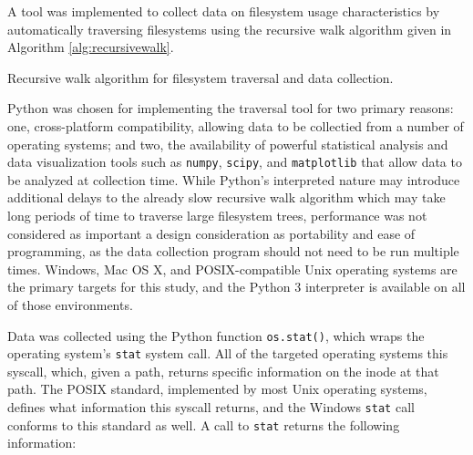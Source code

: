 \documentclass[12pt,a4paper]{article}
\begin{document}
			A tool was implemented to collect data on filesystem usage characteristics by automatically traversing filesystems using the recursive walk algorithm given in Algorithm \ref{alg:recursivewalk}.
		
			\begin{algorithm}
				\caption{Recursive walk algorithm for filesystem traversal and data collection.}
				\label{alg:recursivewalk}
				\begin{algorithmic}[1]
			   		\State {}
			     	\State {}
			     	\EndIf
			   	\EndFor
				\EndProcedure
				\end{algorithmic}
			\end{algorithm}

			Python was chosen for implementing the traversal tool for two primary reasons: one, cross-platform compatibility, allowing data to be collectied from a number of operating systems; and two, the availability of powerful statistical analysis and data visualization tools such as \texttt{numpy}, \texttt{scipy}, and \texttt{matplotlib} that allow data to be analyzed at collection time. While Python's interpreted nature may introduce additional delays to the already slow recursive walk algorithm which may take long periods of time to traverse large filesystem trees, performance was not considered as important a design consideration as portability and ease of programming, as the data collection program should not need to be run multiple times. Windows, Mac OS X, and POSIX-compatible Unix operating systems are the primary targets for this study, and the Python 3 interpreter is available on all of those environments. 

			Data was collected using the Python function \texttt{os.stat()}, which wraps the operating system's \texttt{stat} system call. All of the targeted operating systems this syscall, which, given a path, returns specific information on the inode at that path. The POSIX standard, implemented by most Unix operating systems, defines what information this syscall returns, and the Windows \texttt{stat} call conforms to this standard as well. A call to \texttt{stat} returns the following information:
\end{document}
